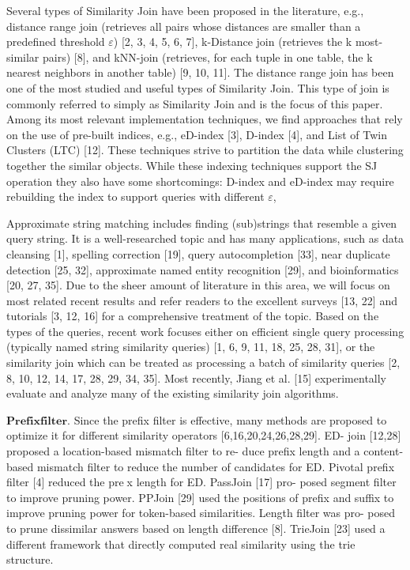 \documentclass{sig-alternate}
\begin{document}
Several types of Similarity Join have been proposed in the
literature, e.g., distance range join (retrieves all pairs whose distances
are smaller than a predefined threshold $\varepsilon$) [2, 3, 4, 5, 6,
7], k-Distance join (retrieves the k most-similar pairs) [8], and
kNN-join (retrieves, for each tuple in one table, the k nearest neighbors
in another table) [9, 10, 11]. The distance range join
has been one of the most studied and useful types of Similarity
Join. This type of join is commonly referred to simply as Similarity
Join and is the focus of this paper. Among its most relevant
implementation techniques, we find approaches that rely
on the use of pre-built indices, e.g., eD-index [3], D-index [4],
and List of Twin Clusters (LTC) [12]. These techniques strive
to partition the data while clustering together the similar objects.
While these indexing techniques support the SJ operation
they also have some shortcomings: D-index and eD-index may
require rebuilding the index to support queries with different $\varepsilon$,

Approximate string matching includes finding (sub)strings
that resemble a given query string. It is a well-researched
topic and has many applications, such as data cleansing [1],
spelling correction [19], query autocompletion [33], near duplicate
detection [25, 32], approximate named entity recognition
[29], and bioinformatics [20, 27, 35].
Due to the sheer amount of literature in this area, we will
focus on most related recent results and refer readers to the
excellent surveys [13, 22] and tutorials [3, 12, 16] for a comprehensive
treatment of the topic.
Based on the types of the queries, recent work focuses either
on efficient single query processing (typically named string
similarity queries) [1, 6, 9, 11, 18, 25, 28, 31], or the similarity
join which can be treated as processing a batch of similarity
queries [2, 8, 10, 12, 14, 17, 28, 29, 34, 35]. Most recently,
Jiang et al. [15] experimentally evaluate and analyze many of
the existing similarity join algorithms.


$\mathbf{Prefix filter.}$ Since the prefix
filter is effective, many methods are proposed to optimize it
for different similarity operators [6,16,20,24,26,28,29]. ED-
join [12,28] proposed a location-based mismatch filter to re-
duce prefix length and a content-based mismatch filter to
reduce the number of candidates for ED. Pivotal prefix filter [4] reduced the prex length for ED. PassJoin [17] pro-
posed segment filter to improve pruning power. PPJoin [29]
used the positions of prefix and suffix to improve pruning
power for token-based similarities. Length filter was pro-
posed to prune dissimilar answers based on length difference [8]. TrieJoin [23] used a different framework that directly computed real similarity using the trie structure.
\end{document}

